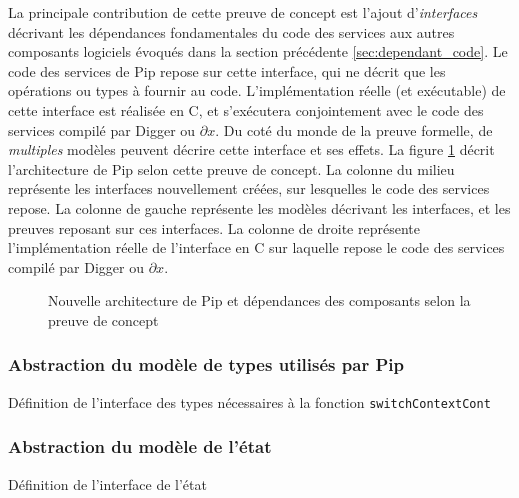 		La principale contribution de cette preuve de concept est l'ajout d'\emph{interfaces} décrivant les dépendances fondamentales du code des services aux autres composants logiciels évoqués dans la section précédente \ref{sec:dependant_code}. Le code des services de Pip repose sur cette interface, qui ne décrit que les opérations ou types à fournir au code. L'implémentation réelle (et exécutable) de cette interface est réalisée en C, et s'exécutera conjointement avec le code des services compilé par Digger ou $\partial x$. Du coté du monde de la preuve formelle, de \emph{multiples} modèles peuvent décrire cette interface et ses effets. La figure \ref{fig:new_pip_architecture} décrit l'architecture de Pip selon cette preuve de concept. La colonne du milieu représente les interfaces nouvellement créées, sur lesquelles le code des services repose. La colonne de gauche représente les modèles décrivant les interfaces, et les preuves reposant sur ces interfaces. La colonne de droite représente l'implémentation réelle de l'interface en C sur laquelle repose le code des services compilé par Digger ou $\partial x$.

			\begin{figure}[!ht]
				
				\caption{Nouvelle architecture de Pip et dépendances des composants selon la preuve de concept}
				\label{fig:new_pip_architecture}
			\end{figure}

			\subsubsection{Abstraction du modèle de types utilisés par Pip}

			\begin{listing}[!ht]
				\caption{Définition de l'interface des types nécessaires à la fonction \texttt{switchContextCont}}
				\label{code:TypesParameter}
			\end{listing}

			\subsubsection{Abstraction du modèle de l'état}

			\begin{listing}[!ht]
				\caption{Définition de l'interface de l'état}
				\label{code:StateParameter}
			\end{listing}

